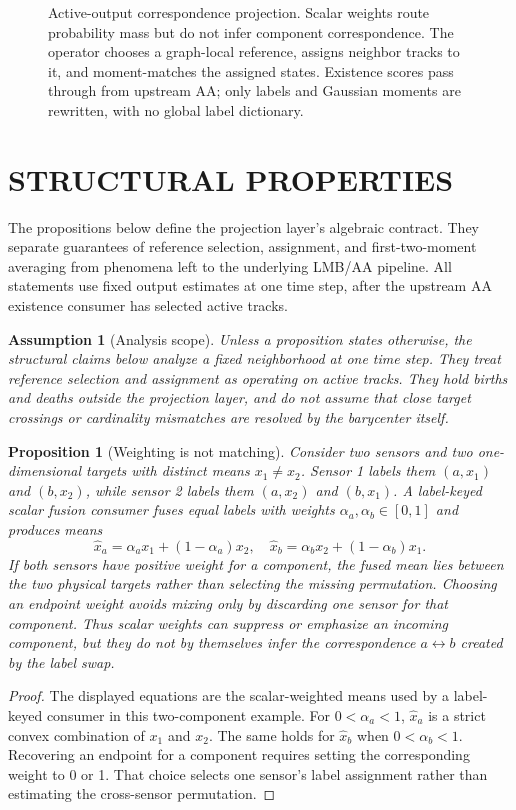 \documentclass{IEEEtaes}
\newtheorem{proposition}{Proposition}
\newtheorem{assumption}{Assumption}
\begin{document}
\begin{figure}[t]
\centering

\caption{Active-output correspondence projection. Scalar weights route probability mass but do not infer component correspondence. The operator chooses a graph-local reference, assigns neighbor tracks to it, and moment-matches the assigned states. Existence scores pass through from upstream AA; only labels and Gaussian moments are rewritten, with no global label dictionary.}
\label{fig:method}
\end{figure}

\section{STRUCTURAL PROPERTIES}
The propositions below define the projection layer's algebraic contract. They separate guarantees of reference selection, assignment, and first-two-moment averaging from phenomena left to the underlying LMB/AA pipeline. All statements use fixed output estimates at one time step, after the upstream AA existence consumer has selected active tracks.

\begin{assumption}[Analysis scope]
Unless a proposition states otherwise, the structural claims below analyze a fixed neighborhood at one time step. They treat reference selection and assignment as operating on active tracks. They hold births and deaths outside the projection layer, and do not assume that close target crossings or cardinality mismatches are resolved by the barycenter itself.
\end{assumption}

\begin{proposition}[Weighting is not matching]
Consider two sensors and two one-dimensional targets with distinct means $x_1\ne x_2$. Sensor 1 labels them $(a,x_1)$ and $(b,x_2)$, while sensor 2 labels them $(a,x_2)$ and $(b,x_1)$. A label-keyed scalar fusion consumer fuses equal labels with weights $\alpha_a,\alpha_b\in[0,1]$ and produces means
\begin{equation}
  \hat{x}_a=\alpha_a x_1+(1-\alpha_a)x_2,\quad
  \hat{x}_b=\alpha_b x_2+(1-\alpha_b)x_1 .
\end{equation}
If both sensors have positive weight for a component, the fused mean lies between the two physical targets rather than selecting the missing permutation. Choosing an endpoint weight avoids mixing only by discarding one sensor for that component. Thus scalar weights can suppress or emphasize an incoming component, but they do not by themselves infer the correspondence $a\leftrightarrow b$ created by the label swap.
\end{proposition}
\begin{proof}
The displayed equations are the scalar-weighted means used by a label-keyed consumer in this two-component example. For $0<\alpha_a<1$, $\hat{x}_a$ is a strict convex combination of $x_1$ and $x_2$. The same holds for $\hat{x}_b$ when $0<\alpha_b<1$. Recovering an endpoint for a component requires setting the corresponding weight to 0 or 1. That choice selects one sensor's label assignment rather than estimating the cross-sensor permutation.
\end{proof}
\end{document}

